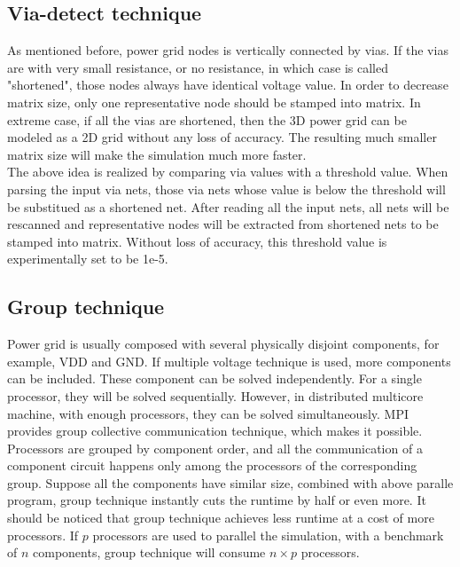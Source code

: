 \documentclass{sig-alternate}
\begin{document}
  \subsection{Via-detect technique}
	As mentioned before, power grid nodes is vertically connected by vias. If the vias are with very small resistance, or no 
	resistance, in which case is called "shortened", those nodes always have identical voltage value. In order to decrease matrix
	size, only one representative node should be stamped into matrix. In extreme case, if all the
	vias are shortened, then the 3D power grid can be modeled as a 2D grid without any loss of accuracy. The resulting much smaller 
	matrix size will make the simulation much more faster.\\ 
 
	The above idea is realized by comparing via values with a threshold value. When parsing the input
	via nets, those via nets whose value is below the threshold will be substitued as a shortened net. After reading all the 
	input nets, all nets will be rescanned and representative nodes will be extracted from shortened nets to be stamped into matrix. 
	Without loss of accuracy, this threshold value is experimentally set to be 1e-5.\\
 
  \subsection{Group technique} 
	Power grid is usually composed with several physically disjoint components, for example,
	VDD and GND. If multiple voltage technique is used, more components can be included. These component can be solved independently. 
	For a single processor, they will be solved sequentially. However, in distributed multicore machine, 
	with enough processors, they can be solved simultaneously. MPI provides group collective communication technique, which makes 
	it possible. Processors are grouped by component order, and all the communication of a component circuit happens only among 
	the processors of the corresponding group. Suppose all the components have similar size, combined with above paralle program, 
	group technique instantly cuts the runtime by half or even more. It should be noticed that group technique achieves less runtime
	at a cost of more processors. If $p$ processors are used to parallel the simulation, with a benchmark of $n$ components, group 
	technique will consume $n\times p$ processors. \\ 
 
\end{document}
